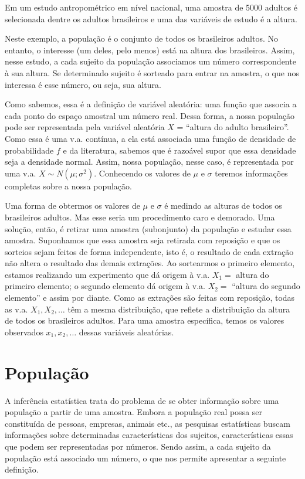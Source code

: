\documentclass[
]{book}
\begin{document}
Em um estudo antropométrico em nível nacional, uma amostra de 5000 adultos é selecionada dentre os adultos brasileiros e uma das variáveis de estudo é a altura.

Neste exemplo, a população é o conjunto de todos os brasileiros adultos. No entanto, o interesse (um deles, pelo menos) está na altura dos brasileiros. Assim, nesse estudo, a cada sujeito da população associamos um número correspondente à sua altura. Se determinado sujeito é sorteado para entrar na amostra, o que nos interessa é esse número, ou seja, sua altura.

Como sabemos, essa é a definição de variável aleatória: uma função que associa a cada ponto do espaço amostral um número real. Dessa forma, a nossa população pode ser representada pela variável aleatória \(X\) = ``altura do adulto brasileiro''. Como essa é uma v.a. contínua, a ela está associada uma função de densidade de probabilidade \(f\) e da literatura, sabemos que é razoável supor que essa densidade seja a densidade normal. Assim, nossa população, nesse caso, é representada por uma v.a. \(X\sim N(\mu; \sigma^2)\). Conhecendo os valores de \(\mu\) e \(\sigma\) teremos informações completas sobre a nossa população.

Uma forma de obtermos os valores de \(\mu\) e \(\sigma\) é medindo as alturas de todos os brasileiros adultos. Mas esse seria um procedimento caro e demorado. Uma solução, então, é retirar uma amostra (subonjunto) da população e estudar essa amostra. Suponhamos que essa amostra seja retirada com reposição e que os sorteios sejam feitos de forma independente, isto é, o resultado de cada extração não altera o resultado das demais extrações. Ao sortearmos o primeiro elemento, estamos realizando um experimento que dá origem à v.a. \(X_1=\) altura do primeiro elemento; o segundo elemento dá origem à v.a. \(X_2=\) ``altura do segundo elemento'' e assim por diante. Como as extrações são feitas com reposição, todas as v.a. \(X_1, X_2, \ldots\) têm a mesma distribuição, que reflete a distribuição da altura de todos os brasileiros adultos. Para uma amostra específica, temos os valores observados \(x_1, x_2, \ldots\) dessas variáveis aleatórias.

\hypertarget{populauxe7uxe3o}{%
\section{População}\label{populauxe7uxe3o}}

A inferência estatística trata do problema de se obter informação sobre uma população a partir de uma amostra. Embora a população real possa ser constituída de pessoas, empresas, animais etc., as pesquisas estatísticas buscam informações sobre determinadas características dos sujeitos, características essas que podem ser representadas por números. Sendo assim, a cada sujeito da população está associado um número, o que nos permite apresentar a seguinte definição.
\end{document}

